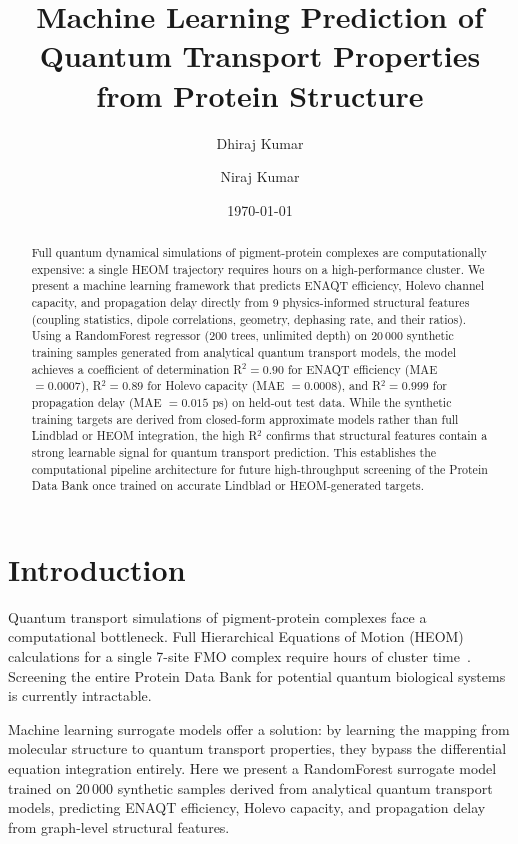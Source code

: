 \documentclass[aps,prl,twocolumn,showpacs,superscriptaddress]{revtex4-2}
\begin{document}
\title{Machine Learning Prediction of Quantum Transport Properties from Protein Structure}

\author{Dhiraj Kumar}
\author{Niraj Kumar}
\affiliation{}

\date{\today}

\begin{abstract}
Full quantum dynamical simulations of pigment-protein complexes are computationally expensive: a single HEOM trajectory requires hours on a high-performance cluster. We present a machine learning framework that predicts ENAQT efficiency, Holevo channel capacity, and propagation delay directly from 9 physics-informed structural features (coupling statistics, dipole correlations, geometry, dephasing rate, and their ratios). Using a RandomForest regressor (200 trees, unlimited depth) on 20\,000 synthetic training samples generated from analytical quantum transport models, the model achieves a coefficient of determination R$^2 = 0.90$ for ENAQT efficiency (MAE $= 0.0007$), R$^2 = 0.89$ for Holevo capacity (MAE $= 0.0008$), and R$^2 = 0.999$ for propagation delay (MAE $= 0.015$ ps) on held-out test data. While the synthetic training targets are derived from closed-form approximate models rather than full Lindblad or HEOM integration, the high R$^2$ confirms that structural features contain a strong learnable signal for quantum transport prediction. This establishes the computational pipeline architecture for future high-throughput screening of the Protein Data Bank once trained on accurate Lindblad or HEOM-generated targets.
\end{abstract}

\maketitle

\section{Introduction}

Quantum transport simulations of pigment-protein complexes face a computational bottleneck. Full Hierarchical Equations of Motion (HEOM) calculations for a single 7-site FMO complex require hours of cluster time~\cite{Firmenich2026}. Screening the entire Protein Data Bank for potential quantum biological systems is currently intractable.

Machine learning surrogate models offer a solution: by learning the mapping from molecular structure to quantum transport properties, they bypass the differential equation integration entirely. Here we present a RandomForest surrogate model trained on 20\,000 synthetic samples derived from analytical quantum transport models, predicting ENAQT efficiency, Holevo capacity, and propagation delay from graph-level structural features.
\end{document}
